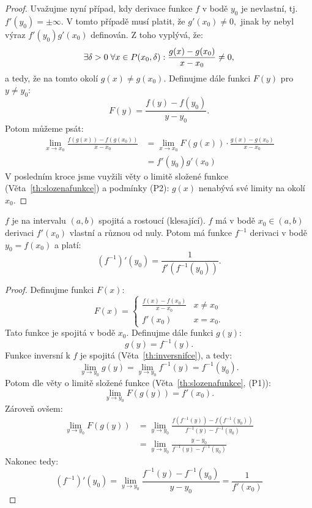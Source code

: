 \begin{proof}
    Uvažujme nyní případ, kdy derivace funkce $f$ v bodě $y_0$ je nevlastní, 
    tj. $f'(y_0) = \pm \infty.$ V tomto případě musí platit, že 
    $g'(x_0) \neq 0,$ jinak by nebyl výraz $f'(y_0)g'(x_0)$ definován.
    Z toho vyplývá, že:
    $$\exists \delta > 0 \; \forall x \in P(x_0, \delta): \frac{g(x) - g(x_0)}{x-x_0}
    \neq 0,$$
    a tedy, že na tomto okolí $g(x) \neq g(x_0).$ Definujme dále funkci 
    $F(y)$ pro $y \neq y_0$:
    $$F(y) = \frac{f(y) - f(y_0)}{y - y_0}.$$
    Potom můžeme psát:
    \begin{align*}
        \lim_{x \to x_0} \frac{f(g(x)) - f(g(x_0))}{x-x_0} 
        &= \lim_{x \to x_0} F(g(x)) \cdot \frac{g(x)-g(x_0)}{x-x_0} \\
        &= f'(y_0)g'(x_0) \tag{viz níže} 
    \end{align*}
    V posledním kroce jsme vuyžili věty o limitě složené funkce 
    (Věta~\ref{th:slozenafunkce}) a podmínky (P2): $g(x)$ nenabývá své limity
    na okolí $x_0.$
\end{proof}

\begin{theorem}
    \label{th:derivaceinv}
    \Necht $f$ je na intervalu $(a,b)$ spojitá a rostoucí (klesající). \Necht
    $f$ má v bodě $x_0 \in (a,b)$ derivaci $f'(x_0)$ vlastní a různou od nuly.
    Potom má funkce $f^{-1}$ derivaci v bodě $y_0 = f(x_0)$ a platí:
    $$(f^{-1})'(y_0) = \frac{1}{f'(f^{-1}(y_0))}.$$
\end{theorem}

\begin{proof}
    Definujme funkci $F(x):$
    $$F(x) = 
        \begin{cases}
            \frac{f(x) - f(x_0)}{x-x_0} &x \neq x_0 \\
            f'(x_0) &x=x_0.
        \end{cases}
    $$
    Tato funkce je spojitá v bodě $x_0$. Definujme dále funkci $g(y):$
    $$g(y) = f^{-1}(y).$$
    Funkce inversní k $f$ je spojitá (Věta~\ref{th:inversnifce}), a tedy:
    $$\lim_{y \to y_0} g(y) = \lim_{y \to y_0} f^{-1}(y) = f^{-1}(y_0).$$
    Potom dle věty o limitě složené funkce (Věta~\ref{th:slozenafunkce}, (P1)):
    $$\lim_{y\to y_0} F(g(y)) = f'(x_0).$$
    Zároveň ovšem:
    \begin{align*}
        \lim_{y\to y_0} F(g(y)) 
        &= \lim_{y\to y_0} \frac{f(f^{-1}(y)) - f(f^{-1}(y_0))}{f^{-1}(y) - f^{-1}(y_0)} \\
        &= \lim_{y\to y_0} \frac{y - y_0}{f^{-1}(y) - f^{-1}(y_0)}
    \end{align*}
    Nakonec tedy:
    $$(f^{-1})'(y_0) = \lim_{y\to y_0}\frac{f^{-1}(y) - f^{-1}(y_0)}{y - y_0} = \frac{1}{f'(x_0)}$$
\end{proof}

